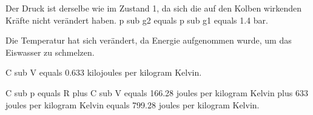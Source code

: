 Der Druck ist derselbe wie im Zustand 1, da sich die auf den Kolben wirkenden Kräfte nicht verändert haben. p sub g2 equals p sub g1 equals 1.4 bar.  

Die Temperatur hat sich verändert, da Energie aufgenommen wurde, um das Eiswasser zu schmelzen.  

C sub V equals 0.633 kilojoules per kilogram Kelvin.  

C sub p equals R plus C sub V equals 166.28 joules per kilogram Kelvin plus 633 joules per kilogram Kelvin equals 799.28 joules per kilogram Kelvin.